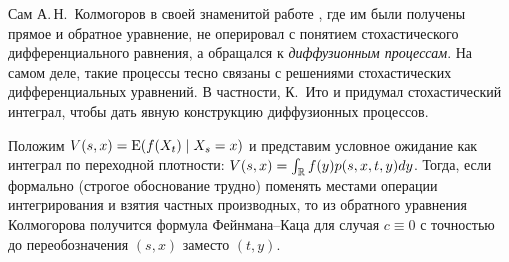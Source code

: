 \begin{remark}
Сам А.\,Н.\ Колмогоров в своей знаменитой работе \cite{Kolmogorov31}, где им были получены прямое и обратное уравнение, не оперировал с понятием стохастического дифференциального равнения, а обращался к \emph{диффузионным процессам}.
На самом деле, такие процессы тесно связаны с решениями стохастических дифференциальных уравнений.
В частности, К.~Ито и придумал стохастический интеграл, чтобы дать явную конструкцию диффузионных процессов.
\end{remark}

\begin{remark}
Положим $V(s,x) = \operatorname{E} (f(X_t) \mid X_s = x)$ и представим условное ожидание как интеграл по переходной плотности: $V(s,x) = \int_{\mathbb{R}} f(y) p(s,x,t,y) dy$.
Тогда, если формально (строгое обоснование трудно) поменять местами операции интегрирования и взятия частных производных, то из обратного уравнения Колмогорова получится формула Фейнмана--Каца для случая $c\equiv 0$ с точностью до переобозначения $(s,x)$ заместо $(t,y)$.
\end{remark}


\summary

